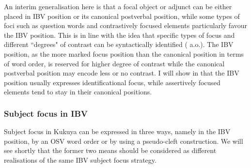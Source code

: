 \documentclass[output=paper,colorlinks,citecolor=brown,
]{langscibook}
\begin{document}
An interim generalisation here is that a focal object or adjunct can be either placed in IBV position or its canonical postverbal position, while some types of foci such as question words and contrastively focused elements particularly favour the IBV position. This is in line with the idea that specific types of focus and different ``degrees" of contrast can be syntactically identified (\citealt{Cruschina2021} a.o.). The IBV position, as the more marked focus position than the canonical position  in terms of word order, is reserved for higher degree of contrast while the canonical postverbal position may encode less or no contrast. I will show in  that the IBV position usually expresses identificational focus, while assertively focused elements tend to stay in their canonical positions.
\subsubsection{Subject focus in IBV}\label{teke:sec:3.1.2}
Subject focus in Kukuya can be expressed in three ways, namely in the IBV position, by an OSV word order or by using a pseudo-cleft construction. We will see shortly that the former two means should be considered as different realisations of the same IBV subject focus strategy.
\end{document}
